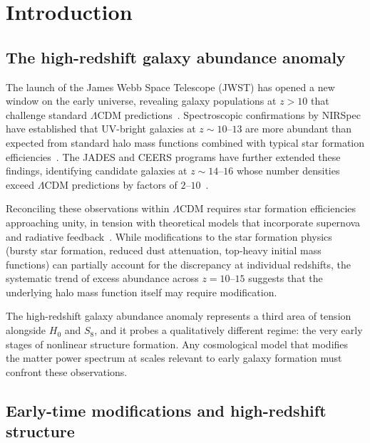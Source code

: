 \documentclass[aps,prd,twocolumn,superscriptaddress,nofootinbib]{revtex4-2}
\begin{document}
\section{Introduction}
\label{sec:intro}

\subsection{The high-redshift galaxy abundance anomaly}
\label{sec:highz_anomaly}

The launch of the James Webb Space Telescope (JWST) has opened a new
window on the early universe, revealing galaxy populations at
$z > 10$ that challenge standard $\Lambda$CDM
predictions~\cite{Harikane2023,Finkelstein2023,Castellano2022,Naidu2022}.
Spectroscopic confirmations by NIRSpec have established that
UV-bright galaxies at $z \sim 10$--$13$ are more abundant than
expected from standard halo mass functions combined with typical star
formation efficiencies~\cite{CurtisLake2023,Bouwens2023}. The JADES
and CEERS programs have further extended these findings, identifying
candidate galaxies at $z \sim 14$--$16$ whose number densities
exceed $\Lambda$CDM predictions by factors of
$2$--$10$~\cite{PerezGonzalez2023,Finkelstein2023}.

Reconciling these observations within $\Lambda$CDM requires star
formation efficiencies approaching unity, in tension with theoretical
models that incorporate supernova and radiative
feedback~\cite{BoylanKolchin2023}. While modifications to the star
formation physics (bursty star formation, reduced dust attenuation,
top-heavy initial mass functions) can partially account for the
discrepancy at individual redshifts, the systematic trend of excess
abundance across $z = 10$--$15$ suggests that the underlying halo
mass function itself may require modification.

The high-redshift galaxy abundance anomaly represents a third area of
tension alongside $H_0$ and $S_8$, and it probes a qualitatively
different regime: the very early stages of nonlinear structure
formation. Any cosmological model that modifies the matter power
spectrum at scales relevant to early galaxy formation must confront
these observations.

\subsection{Early-time modifications and high-redshift structure}
\label{sec:early_mods}
\end{document}
